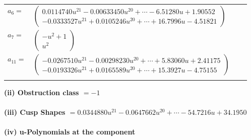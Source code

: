 \documentclass[1p]{elsarticle_modified}
\theoremstyle{definition}
\begin{document}
\begin{tabular}{m{7pt} m{180pt} m{7pt} m{180pt} }
\flushright $a_{6}=$&$\begin{pmatrix}0.0114740 u^{21}-0.00633450 u^{20}+\cdots-6.51280 u+1.90552\\-0.0333527 u^{21}+0.0105246 u^{20}+\cdots+16.7996 u-4.51821\end{pmatrix}$ \\
\flushright $a_{7}=$&$\begin{pmatrix}- u^2+1\\u^2\end{pmatrix}$ \\
\flushright $a_{11}=$&$\begin{pmatrix}-0.0267510 u^{21}-0.00298230 u^{20}+\cdots+5.83060 u+2.41175\\-0.0193326 u^{21}+0.0165589 u^{20}+\cdots+15.3927 u-4.75155\end{pmatrix}$\\&\end{tabular}
\flushleft \textbf{(ii) Obstruction class $= -1$}\\~\\
\flushleft \textbf{(iii) Cusp Shapes $= 0.0344880 u^{21}-0.0647662 u^{20}+\cdots-54.7216 u+34.1950$}\\~\\
\newpage\renewcommand{\arraystretch}{1}
\flushleft \textbf{(iv) u-Polynomials at the component}\newline \\
\end{document}
